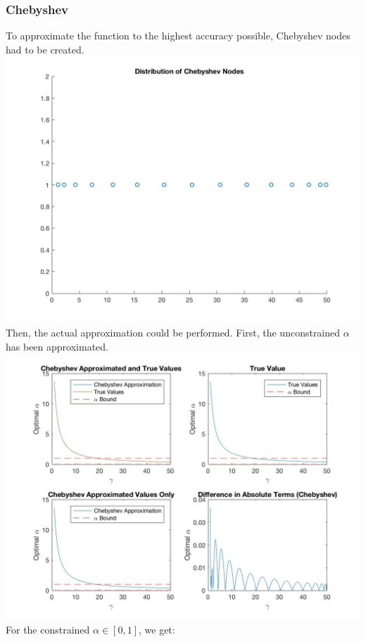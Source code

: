 \documentclass{article}
\begin{document}
\subsubsection{Chebyshev}
To approximate the function to the highest accuracy possible, Chebyshev nodes had to be created. \\
\includegraphics[width = \textwidth, keepaspectratio]{PS4Q3NODES.jpg} 
Then, the actual approximation could be performed. First, the unconstrained $\alpha$ has been approximated. \\
\includegraphics[width = \textwidth, keepaspectratio]{PS4Q3CHEB.jpg}
For the constrained $\alpha \in [0,1]$, we get:\\
\end{document}
